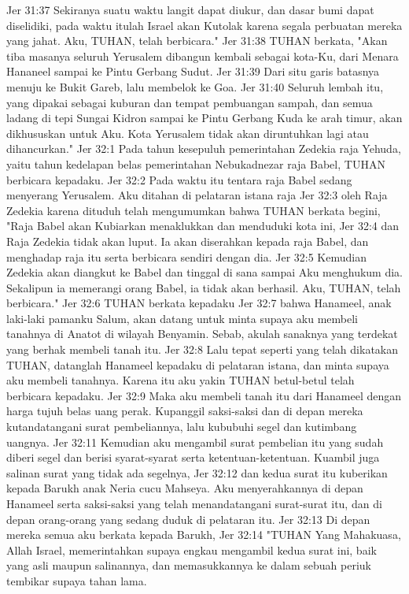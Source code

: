 Jer 31:37  Sekiranya suatu waktu langit dapat diukur, dan dasar bumi dapat diselidiki, pada waktu itulah Israel akan Kutolak karena segala perbuatan mereka yang jahat. Aku, TUHAN, telah berbicara."
Jer 31:38  TUHAN berkata, "Akan tiba masanya seluruh Yerusalem dibangun kembali sebagai kota-Ku, dari Menara Hananeel sampai ke Pintu Gerbang Sudut.
Jer 31:39  Dari situ garis batasnya menuju ke Bukit Gareb, lalu membelok ke Goa.
Jer 31:40  Seluruh lembah itu, yang dipakai sebagai kuburan dan tempat pembuangan sampah, dan semua ladang di tepi Sungai Kidron sampai ke Pintu Gerbang Kuda ke arah timur, akan dikhususkan untuk Aku. Kota Yerusalem tidak akan diruntuhkan lagi atau dihancurkan."
Jer 32:1  Pada tahun kesepuluh pemerintahan Zedekia raja Yehuda, yaitu tahun kedelapan belas pemerintahan Nebukadnezar raja Babel, TUHAN berbicara kepadaku.
Jer 32:2  Pada waktu itu tentara raja Babel sedang menyerang Yerusalem. Aku ditahan di pelataran istana raja
Jer 32:3  oleh Raja Zedekia karena dituduh telah mengumumkan bahwa TUHAN berkata begini, "Raja Babel akan Kubiarkan menaklukkan dan menduduki kota ini,
Jer 32:4  dan Raja Zedekia tidak akan luput. Ia akan diserahkan kepada raja Babel, dan menghadap raja itu serta berbicara sendiri dengan dia.
Jer 32:5  Kemudian Zedekia akan diangkut ke Babel dan tinggal di sana sampai Aku menghukum dia. Sekalipun ia memerangi orang Babel, ia tidak akan berhasil. Aku, TUHAN, telah berbicara."
Jer 32:6  TUHAN berkata kepadaku
Jer 32:7  bahwa Hanameel, anak laki-laki pamanku Salum, akan datang untuk minta supaya aku membeli tanahnya di Anatot di wilayah Benyamin. Sebab, akulah sanaknya yang terdekat yang berhak membeli tanah itu.
Jer 32:8  Lalu tepat seperti yang telah dikatakan TUHAN, datanglah Hanameel kepadaku di pelataran istana, dan minta supaya aku membeli tanahnya. Karena itu aku yakin TUHAN betul-betul telah berbicara kepadaku.
Jer 32:9  Maka aku membeli tanah itu dari Hanameel dengan harga tujuh belas uang perak. Kupanggil saksi-saksi dan di depan mereka kutandatangani surat pembeliannya, lalu kububuhi segel dan kutimbang uangnya.
Jer 32:11  Kemudian aku mengambil surat pembelian itu yang sudah diberi segel dan berisi syarat-syarat serta ketentuan-ketentuan. Kuambil juga salinan surat yang tidak ada segelnya,
Jer 32:12  dan kedua surat itu kuberikan kepada Barukh anak Neria cucu Mahseya. Aku menyerahkannya di depan Hanameel serta saksi-saksi yang telah menandatangani surat-surat itu, dan di depan orang-orang yang sedang duduk di pelataran itu.
Jer 32:13  Di depan mereka semua aku berkata kepada Barukh,
Jer 32:14  "TUHAN Yang Mahakuasa, Allah Israel, memerintahkan supaya engkau mengambil kedua surat ini, baik yang asli maupun salinannya, dan memasukkannya ke dalam sebuah periuk tembikar supaya tahan lama.

